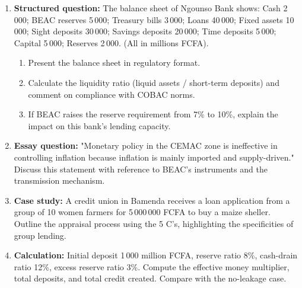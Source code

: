 \documentclass[11pt]{article}
\begin{document}
\begin{exercice}
\begin{enumerate}
\item \textbf{Structured question:} The balance sheet of Ngounso Bank shows: Cash 2\,000; BEAC reserves 5\,000; Treasury bills 3\,000; Loans 40\,000; Fixed assets 10\,000; Sight deposits 30\,000; Savings deposits 20\,000; Time deposits 5\,000; Capital 5\,000; Reserves 2\,000. (All in millions FCFA).
\begin{enumerate}
\item Present the balance sheet in regulatory format.
\item Calculate the liquidity ratio (liquid assets / short-term deposits) and comment on compliance with COBAC norms.
\item If BEAC raises the reserve requirement from 7\% to 10\%, explain the impact on this bank's lending capacity.
\end{enumerate}
\item \textbf{Essay question:} "Monetary policy in the CEMAC zone is ineffective in controlling inflation because inflation is mainly imported and supply-driven." Discuss this statement with reference to BEAC's instruments and the transmission mechanism.
\item \textbf{Case study:} A credit union in Bamenda receives a loan application from a group of 10 women farmers for 5\,000\,000 FCFA to buy a maize sheller. Outline the appraisal process using the 5 C's, highlighting the specificities of group lending.
\item \textbf{Calculation:} Initial deposit 1\,000 million FCFA, reserve ratio 8\%, cash-drain ratio 12\%, excess reserve ratio 3\%. Compute the effective money multiplier, total deposits, and total credit created. Compare with the no-leakage case.
\end{enumerate}
\end{exercice}
\end{document}
